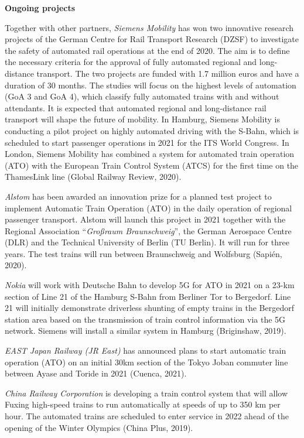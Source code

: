 \documentclass[
]{book}
\begin{document}
\textbf{Ongoing projects}

Together with other partners, \emph{Siemens Mobility} has won two innovative research projects of the German Centre for Rail Transport Research (DZSF) to investigate the safety of automated rail operations at the end of 2020. The aim is to define the necessary criteria for the approval of fully automated regional and long-distance transport. The two projects are funded with 1.7 million euros and have a duration of 30 months. The studies will focus on the highest levels of automation (GoA 3 and GoA 4), which classify fully automated trains with and without attendants. It is expected that automated regional and long-distance rail transport will shape the future of mobility. In Hamburg, Siemens Mobility is conducting a pilot project on highly automated driving with the S-Bahn, which is scheduled to start passenger operations in 2021 for the ITS World Congress. In London, Siemens Mobility has combined a system for automated train operation (ATO) with the European Train Control System (ATCS) for the first time on the ThamesLink line (Global Railway Review, 2020).

\emph{Alstom} has been awarded an innovation prize for a planned test project to implement Automatic Train Operation (ATO) in the daily operation of regional passenger transport. Alstom will launch this project in 2021 together with the Regional Association ``\emph{Großraum Braunschweig}'', the German Aerospace Centre (DLR) and the Technical University of Berlin (TU Berlin). It will run for three years. The test trains will run between Braunschweig and Wolfsburg (Sapién, 2020).

\emph{Nokia} will work with Deutsche Bahn to develop 5G for ATO in 2021 on a 23-km section of Line 21 of the Hamburg S-Bahn from Berliner Tor to Bergedorf. Line 21 will initially demonstrate driverless shunting of empty trains in the Bergedorf station area based on the transmission of train control information via the 5G network. Siemens will install a similar system in Hamburg (Briginshaw, 2019).

\emph{EAST Japan Railway (JR East)} has announced plans to start automatic train operation (ATO) on an initial 30km section of the Tokyo Joban commuter line between Ayase and Toride in 2021 (Cuenca, 2021).

\emph{China Railway Corporation} is developing a train control system that will allow Fuxing high-speed trains to run automatically at speeds of up to 350 km per hour. The automated trains are scheduled to enter service in 2022 ahead of the opening of the Winter Olympics (China Plus, 2019).
\end{document}
